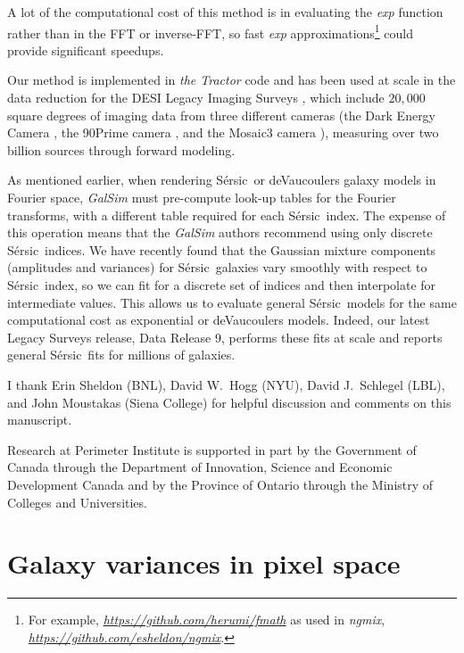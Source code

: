 \documentclass[11pt,letterpaper]{aastex63}
\newcommand{\niceurl}[1]{\href{#1}{\textsl{#1}}}
\newcommand{\project}[1]{\textsl{#1}}
\newcommand{\sersic}{S\'ersic}
\begin{document}
A lot of the computational cost of this method is in
evaluating the \emph{exp} function rather than in the FFT or
inverse-FFT, so fast \emph{exp} approximations\footnote{For example,
  \niceurl{https://github.com/herumi/fmath} as used in
  \project{ngmix}, \niceurl{https://github.com/esheldon/ngmix}.}
could provide significant speedups.
%


Our method is implemented in \project{the Tractor} code and has been
used at scale in the data reduction for the DESI Legacy Imaging Surveys
\citep{dey}, which include $20,000$ square degrees of imaging data from
three different cameras (the Dark Energy Camera \citep{decam},
the 90Prime camera \citep{90prime}, and the Mosaic3 camera \citep{mosaic3}),
measuring over two billion sources through forward modeling.


As mentioned earlier, when rendering \sersic\ or deVaucoulers galaxy
models in Fourier space, \project{GalSim} must pre-compute look-up
tables for the Fourier transforms, with a different table required for
each \sersic\ index.  The expense of this operation means that the
\project{GalSim} authors recommend using only discrete
\sersic\ indices.  We have recently found that the Gaussian mixture
components (amplitudes and variances) for \sersic\ galaxies vary
smoothly with respect to \sersic\ index, so we can fit for a discrete
set of indices and then interpolate for intermediate values.
This allows us to evaluate general \sersic\ models for the same
computational cost as exponential or deVaucoulers models.
Indeed, our latest Legacy Surveys release, Data Release 9, performs
these fits at scale and reports general \sersic\ fits for millions of
galaxies.




\acknowledgements

I thank Erin Sheldon (BNL),
David W.~Hogg (NYU), David J.~Schlegel (LBL), and John Moustakas (Siena College)
for helpful discussion and comments on this manuscript.

Research at Perimeter Institute is supported in part by the Government
of Canada through the Department of Innovation, Science and Economic
Development Canada and by the Province of Ontario through the Ministry
of Colleges and Universities.


\clearpage
\appendix

\section{Galaxy variances in pixel space}
\label{app:transform}
\end{document}
